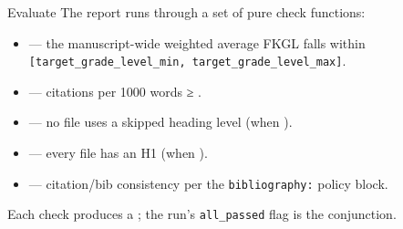 \documentclass[
  ignorenonframetext,
]{beamer}
\providecommand{\tightlist}{%
  \setlength{\itemsep}{0pt}\setlength{\parskip}{0pt}}
\begin{document}
\begin{frame}{Evaluate}
\protect{}\label{evaluate}
The report runs through a set of pure check functions:

\begin{itemize}
\tightlist
\item
   --- the manuscript-wide weighted
  average FKGL falls within
  \texttt{{[}target\_grade\_level\_min,\ target\_grade\_level\_max{]}}.
\item
   --- citations per 1000 words ≥
  .
\item
   --- no file uses a skipped
  heading level (when ).
\item
   --- every file has an H1 (when
  ).
\item
   --- citation/bib consistency per the
  \texttt{bibliography:} policy block.
\end{itemize}

Each check produces a ;
the run's \texttt{all\_passed} flag is the conjunction.
\end{frame}
\end{document}
